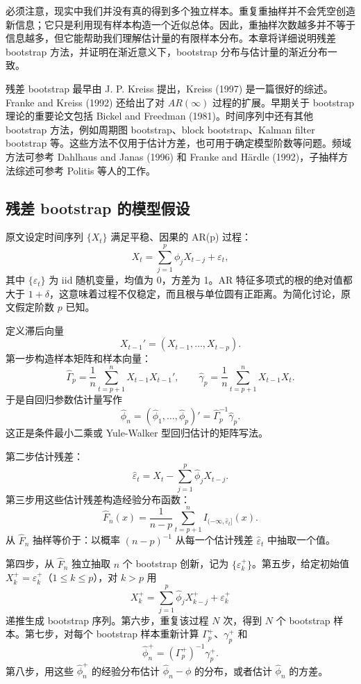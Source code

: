 \documentclass[11pt,a4paper]{ctexart}
\begin{document}
必须注意，现实中我们并没有真的得到多个独立样本。重复重抽样并不会凭空创造新信息；它只是利用现有样本构造一个近似总体。因此，重抽样次数越多并不等于信息越多，但它能帮助我们理解估计量的有限样本分布。本章将详细说明残差 bootstrap 方法，并证明在渐近意义下，bootstrap 分布与估计量的渐近分布一致。

残差 bootstrap 最早由 J. P. Kreiss 提出，Kreiss (1997) 是一篇很好的综述。Franke and Kreiss (1992) 还给出了对 \(AR(\infty)\) 过程的扩展。早期关于 bootstrap 理论的重要论文包括 Bickel and Freedman (1981)。时间序列中还有其他 bootstrap 方法，例如周期图 bootstrap、block bootstrap、Kalman filter bootstrap 等。这些方法不仅用于估计方差，也可用于确定模型阶数等问题。频域方法可参考 Dahlhaus and Janas (1996) 和 Franke and Härdle (1992)，子抽样方法综述可参考 Politis 等人的工作。

\subsection{残差 bootstrap 的模型假设}

原文设定时间序列 \(\{X_t\}\) 满足平稳、因果的 AR(p) 过程：
\[
  X_t=\sum_{j=1}^p\phi_jX_{t-j}+\varepsilon_t,
\]
其中 \(\{\varepsilon_t\}\) 为 iid 随机变量，均值为 0，方差为 1。AR 特征多项式的根的绝对值都大于 \(1+\delta\)，这意味着过程不仅稳定，而且根与单位圆有正距离。为简化讨论，原文假定阶数 \(p\) 已知。

定义滞后向量
\[
  X_{t-1}'=(X_{t-1},\ldots,X_{t-p}).
\]
第一步构造样本矩阵和样本向量：
\[
  \hat\Gamma_p=\frac1n\sum_{t=p+1}^nX_{t-1}X_{t-1}',
  \qquad
  \hat\gamma_p=\frac1n\sum_{t=p+1}^nX_{t-1}X_t.
  \tag{15.1}
\]
于是自回归参数估计量写作
\[
  \hat\phi_n=(\hat\phi_1,\ldots,\hat\phi_p)'
  =\hat\Gamma_p^{-1}\hat\gamma_p.
\]
这正是条件最小二乘或 Yule-Walker 型回归估计的矩阵写法。

第二步估计残差：
\[
  \hat\varepsilon_t=X_t-\sum_{j=1}^p\hat\phi_jX_{t-j}.
\]
第三步用这些估计残差构造经验分布函数：
\[
  \hat F_n(x)
  =\frac1{n-p}\sum_{t=p+1}^n I_{(-\infty,\hat\varepsilon_t]}(x).
\]
从 \(\hat F_n\) 抽样等价于：以概率 \((n-p)^{-1}\) 从每一个估计残差 \(\hat\varepsilon_t\) 中抽取一个值。

第四步，从 \(\hat F_n\) 独立抽取 \(n\) 个 bootstrap 创新，记为 \(\{\varepsilon_k^+\}\)。第五步，给定初始值 \(X_k^+=\varepsilon_k^+\)（\(1\le k\le p\)），对 \(k>p\) 用
\[
  X_k^+=\sum_{j=1}^p\hat\phi_jX_{k-j}^+ + \varepsilon_k^+
\]
递推生成 bootstrap 序列。第六步，重复该过程 \(N\) 次，得到 \(N\) 个 bootstrap 样本。第七步，对每个 bootstrap 样本重新计算 \(\Gamma_p^+\)、\(\gamma_p^+\) 和
\[
  \hat\phi_n^+=(\Gamma_p^+)^{-1}\gamma_p^+.
\]
第八步，用这些 \(\hat\phi_n^+\) 的经验分布估计 \(\hat\phi_n-\phi\) 的分布，或者估计 \(\hat\phi_n\) 的方差。
\end{document}
